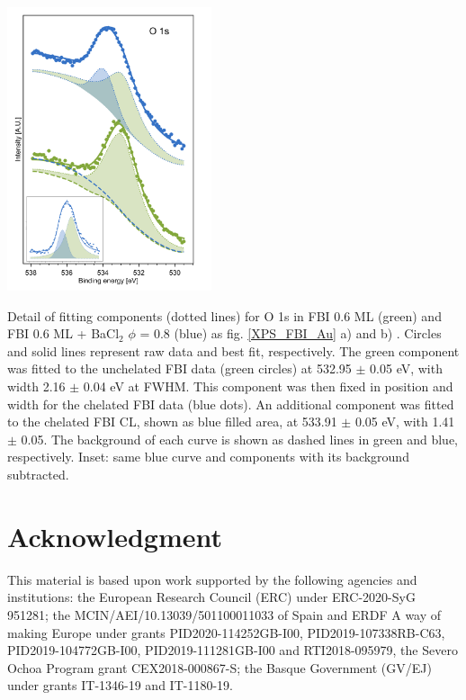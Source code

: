 \documentclass[aps,prl,reprint,longbibliography,superscriptaddress, english]{revtex4-1}
\begin{document}
\begin{center}
	\includegraphics[width=0.45\textwidth]{figures/fig6_fit.pdf}
	\captionsetup{type=figure} %
	\caption{\label{XPS_fits} Detail of fitting components (dotted lines) for O 1s in FBI 0.6 ML (green) and FBI 0.6 ML + BaCl$_2$ $\phi$ = 0.8 (blue) as fig. \ref{XPS_FBI_Au} a) and b) . Circles and solid lines represent raw data and best fit, respectively. The green component was fitted to the unchelated FBI data (green circles) at 532.95 $\pm$ 0.05 eV, with width 2.16 $\pm$ 0.04 eV at FWHM. This component was then fixed in position and width for the chelated FBI data (blue dots). An additional component was fitted to the chelated FBI CL, shown as blue filled area, at 533.91 $\pm$ 0.05 eV,  with 1.41 $\pm$ 0.05. The background of each curve is shown as dashed lines in green and blue, respectively. Inset: same blue curve and components with its background subtracted.}
\end{center}


\section{Acknowledgment}
This material is based upon work supported by the following agencies and institutions: the European Research Council (ERC) under ERC-2020-SyG 951281; the MCIN/AEI/10.13039/501100011033 of Spain and ERDF A way of making Europe under grants PID2020-114252GB-I00, PID2019-107338RB-C63, PID2019-104772GB-I00, PID2019-111281GB-I00 and RTI2018-095979, the Severo Ochoa Program grant CEX2018-000867-S; the Basque Government (GV/EJ) under grants IT-1346-19 and IT-1180-19. 
\end{document}
